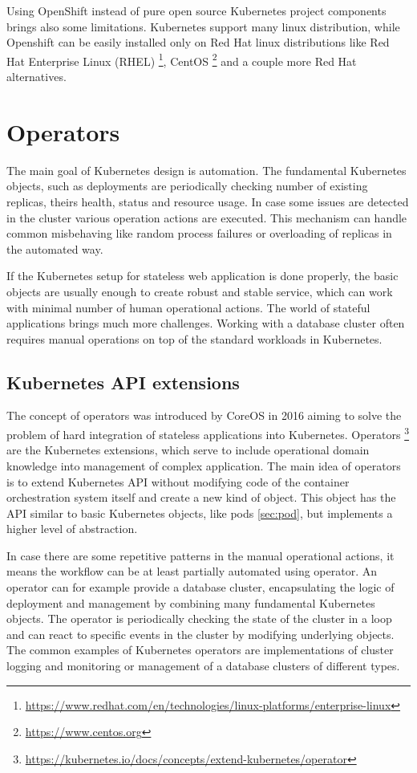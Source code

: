 \documentclass[
  digital, %
  twoside, %
  table,   %
  lof,     %
  lot,     %
]{fithesis3}
\begin{document}
Using OpenShift instead of pure open source Kubernetes project components brings also some limitations. Kubernetes support many linux distribution, while Openshift can be easily installed only on Red Hat linux distributions like Red Hat Enterprise Linux (RHEL) \footnote{\url{https://www.redhat.com/en/technologies/linux-platforms/enterprise-linux}}, CentOS \footnote{\url{https://www.centos.org}} and a couple more Red Hat alternatives.

\section{Operators}
The main goal of Kubernetes design is automation. The fundamental Kubernetes objects, such as deployments are periodically checking number of existing replicas, theirs health, status and resource usage. In case some issues are detected in the cluster various operation actions are executed. This mechanism can handle common misbehaving like random process failures or overloading of replicas in the automated way.

If the Kubernetes setup for stateless web application is done properly, the basic objects are usually enough to create robust and stable service, which can work with minimal number of human operational actions. The world of stateful applications brings much more challenges. Working with a database cluster often requires manual operations on top of the standard workloads in Kubernetes.

\subsection{Kubernetes API extensions}
The concept of operators was introduced by CoreOS \cite{operators} in 2016 aiming to solve the problem of hard integration of stateless applications into Kubernetes. Operators \footnote{\url{https://kubernetes.io/docs/concepts/extend-kubernetes/operator}} are the Kubernetes extensions, which serve to include operational domain knowledge into management of complex application. The main idea of operators is to extend Kubernetes API without modifying code of the container orchestration system itself and create a new kind of object. This object has the API similar to basic Kubernetes objects, like pods \ref{sec:pod}, but implements a higher level of abstraction.

In case there are some repetitive patterns in the manual operational actions, it means the workflow can be at least partially automated using operator. An operator can for example provide a database cluster, encapsulating the logic of deployment and management by combining many fundamental Kubernetes objects. The operator is periodically checking the state of the cluster in a loop and can react to specific events in the cluster by modifying underlying objects. The common examples of Kubernetes operators are implementations of cluster logging and monitoring or management of a database clusters of different types.
\end{document}
